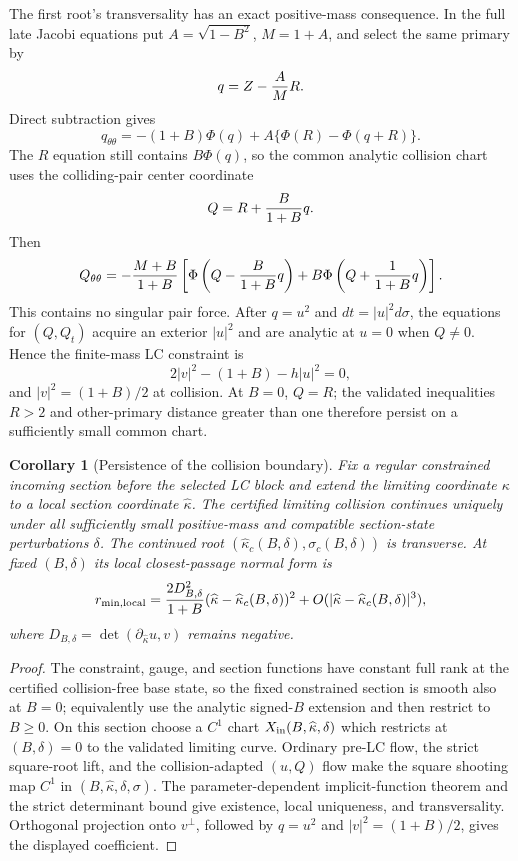 \documentclass[11pt]{article}
\newtheorem{corollary}[theorem]{Corollary}
\begin{document}
The first root's transversality has an exact positive-mass consequence.  In the full late
Jacobi equations put $A=\sqrt{1-B^2}$, $M=1+A$, and select the same primary by
\[
 q=Z-{A\over M}R.
\]
Direct subtraction gives
\[
 q_{\theta\theta}=-(1+B)\Phi(q)
 +A\{\Phi(R)-\Phi(q+R)\}.
\]
The $R$ equation still contains $B\Phi(q)$, so the common analytic collision
chart uses the colliding-pair center coordinate
\[
 Q=R+{B\over1+B}q.
\]
Then
\[
 Q_{\theta\theta}=-{M+B\over1+B}\left[
 \Phi\left(Q-{B\over1+B}q\right)
 +B\Phi\left(Q+{1\over1+B}q\right)
 \right].
\]
This contains no singular pair force.  After $q=u^2$ and
$dt=|u|^2d\sigma$, the equations for $(Q,Q_t)$ acquire an exterior
$|u|^2$ and are analytic at $u=0$ when $Q\ne0$.
Hence the finite-mass LC constraint is
\[
 2|v|^2-(1+B)-h|u|^2=0,
\]
and $|v|^2=(1+B)/2$ at collision.  At $B=0$, $Q=R$; the validated
inequalities $R>2$ and other-primary distance greater than one therefore
persist on a sufficiently small common chart.

\begin{corollary}[Persistence of the collision boundary]
Fix a regular constrained incoming section before the selected LC block and
extend the limiting coordinate $\kappa$ to a local section coordinate
$\widehat\kappa$.  The certified limiting collision continues uniquely under
all sufficiently small positive-mass and compatible section-state
perturbations $\delta$.  The continued root
$(\widehat\kappa_c(B,\delta),\sigma_c(B,\delta))$ is transverse.  At fixed
$(B,\delta)$ its local closest-passage normal form is
\[
 r_{\min,\mathrm{local}}
 ={2D_{B,\delta}^2\over1+B}
  (\widehat\kappa-\widehat\kappa_c(B,\delta))^2
  +O(|\widehat\kappa-\widehat\kappa_c(B,\delta)|^3),
\]
where $D_{B,\delta}=\det(\partial_{\widehat\kappa}u,v)$ remains negative.
\end{corollary}

\begin{proof}
The constraint, gauge, and section functions have constant full rank at the
certified collision-free base state, so the fixed constrained section is
smooth also at $B=0$; equivalently use the analytic signed-$B$ extension and
then restrict to $B\ge0$.  On this section choose a $C^1$ chart
$X_{\rm in}(B,\widehat\kappa,\delta)$ which restricts at $(B,\delta)=0$ to
the validated limiting curve.  Ordinary pre-LC flow, the strict square-root
lift, and the collision-adapted $(u,Q)$ flow make the square shooting map
$C^1$ in $(B,\widehat\kappa,\delta,\sigma)$.  The parameter-dependent
implicit-function theorem and the strict determinant bound give existence,
local uniqueness, and transversality.  Orthogonal projection onto $v^\perp$,
followed by $q=u^2$ and $|v|^2=(1+B)/2$, gives the displayed coefficient.
\end{proof}
\end{document}
